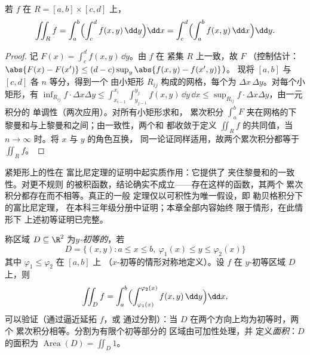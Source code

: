\begin{theorem}[矩形上的富比尼定理]\label{thm:b2:multint:fubini}
若 $f$ 在 $R = [a,b] \times [c,d]$ 上，
\[
\iint_R f
= \int_a^b \Bigl(\int_c^d f(x, y)\,\dd y\Bigr)\dd x
= \int_c^d \Bigl(\int_a^b f(x, y)\,\dd x\Bigr)\dd y .
\]
\end{theorem}

\begin{proof}
记 $F(x) = \int_c^d f(x, y)\,\dd y$。由 $f$ 在
紧集 $R$ 上一致，故 $F$ （控制估计：
$\abs{F(x) - F(x')} \leq (d - c)\sup_y\abs{f(x,y) - f(x',y)}$）。
现将 $[a,b]$ 与 $[c,d]$ 各 $n$ 等分，得到一个
由小矩形 $R_{ij}$ 构成的网格，每个为 $\Delta x\,\Delta y$。对每个小矩形，有
$\inf_{R_{ij}} f \cdot \Delta x \Delta y \leq
\int_{x_{i-1}}^{x_i}\int_{y_{j-1}}^{y_j} f(x,y)\,\dd y\,\dd x \leq
\sup_{R_{ij}} f \cdot \Delta x \Delta y$，由一元积分的
单调性（两次应用）。对所有小矩形求和，
累次积分 $\int_a^b F$ 夹在网格的下
黎曼和与上黎曼和之间；由一致性，两个和
都收敛于定义 $\iint_R f$ 的共同值，当 $n \to
\infty$ 时。将 $x$ 与 $y$ 的角色互换，
同一论证同样适用，故两个累次积分都等于 $\iint_R f$。
\end{proof}

\begin{remark}
紧矩形上的性在
富比尼定理的证明中起实质作用：它提供了
夹住黎曼和的一致性。对更不规则
的被积函数，结论确实不成立——存在这样的函数，其两个
累次积分都存在而不相等。真正的一般
定理仅以可积性为唯一假设，即
勒贝格积分下的富比尼定理，
在本科三年级分册中证明；本章全部内容始终
限于情形，在此情形下
上述初等证明已完整。
\end{remark}

\begin{definition}[初等区域]\label{def:b2:multint:domain}
称区域 $D \subseteq \R^2$ 为\emph{$y$-初等的}，若
\[
D = \{(x, y) : a \leq x \leq b,\
\varphi_1(x) \leq y \leq \varphi_2(x)\}
\]
其中 $\varphi_1 \leq \varphi_2$ 在 $[a,b]$ 上
（$x$-初等的情形对称地定义）。设 $f$ 在
$y$-初等区域 $D$ 上，则
\[
\iint_D f
= \int_a^b\Bigl(
\int_{\varphi_1(x)}^{\varphi_2(x)} f(x,y)\,\dd y\Bigr)\dd x ,
\]
可以验证（通过逼近延拓 $f$，或
通过分割）：当 $D$ 在两个方向上均为初等时，两个
累次积分相等。分割为有限个初等部分的
区域由可加性处理，并
定义\emph{面积}：$D$ 的面积为 $\operatorname
{Area}(D) = \iint_D 1$。
\end{definition}

